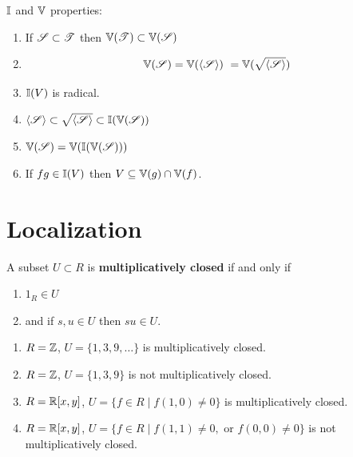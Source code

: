 \documentclass[12pt]{amsart}
\begin{document}
\begin{remark}
    $\mathbb I$ and $\mathbb V$ properties: 
    \begin{enumerate}
        \item If $\operatorname{\mathscr S} \subset \operatorname{\mathscr T}$ then $\mathbb V(\operatorname{\mathscr T}) \subset \mathbb V(\operatorname{\mathscr S})$
        \item \[\mathbb V(\operatorname{\mathscr S}) = \mathbb V(\langle \operatorname{\mathscr S} \rangle)\ = \mathbb V(\sqrt{\langle \operatorname{\mathscr S} \rangle})\]
        \item $\mathbb I(V)$ is radical. 
        \item $\langle \operatorname{\mathscr S} \rangle \subset \sqrt{\langle \operatorname{\mathscr S} \rangle} \subset \mathbb I(\mathbb V(\operatorname{\mathscr S}))$
        \item $\mathbb V(\operatorname{\mathscr S}) = \mathbb V(\mathbb I(\mathbb V(\operatorname{\mathscr S})))$
        \item If $fg \in \mathbb I(V)$ then $V \subseteq \mathbb V(g) \cap \mathbb V(f)$.
    \end{enumerate}
\end{remark}

\section{Localization}

\begin{definition}
    A subset $U \subset R$ is \textbf{multiplicatively closed} if and only if \begin{enumerate}
        \item $1_R \in U$ 
        \item and if $s, u \in U$ then $su \in U$.
    \end{enumerate}

    \begin{example}
    \bbni
       \begin{enumerate}
        \item  $R = \mathbb Z$, $U = \{1, 3, 9, \ldots\}$  is multiplicatively closed. 
        \item $R = \mathbb Z$, $U= \{1, 3, 9\}$ is not multiplicatively closed. 
        \item $R = \mathbb R[x,y]$, $U = \{f \in R \mid f (1,0) \neq 0\}$ is multiplicatively closed. 
        \item $R = \mathbb R[x,y]$, $U = \{f \in R \mid f (1,1) \neq 0, \text{ or } f(0,0) \neq 0\}$ is not multiplicatively closed. 
       \end{enumerate}
    \end{example}
\end{definition}
\end{document}
